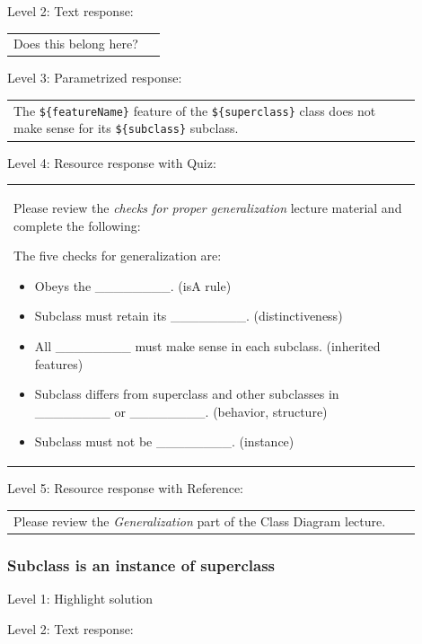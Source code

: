 \noindent Level 2: Text response: \medskip

\begin{tabular}{|p{0.9\linewidth}}
Does this belong here?
\end{tabular} \medskip

\noindent Level 3: Parametrized response: \medskip

\begin{tabular}{|p{0.9\linewidth}}
The \verb|${featureName}| feature of the \verb|${superclass}| class does not make sense for its \verb|${subclass}| subclass.
\end{tabular} \medskip

\noindent Level 4: Resource response with Quiz: \medskip

\begin{tabular}{|p{0.9\linewidth}}
Please review the \textit{checks for proper generalization} lecture material
and complete the following:

The five checks for generalization are:
\begin{itemize}
    \item Obeys the \_\_\_\_\_\_\_\_. (isA rule)
    \item Subclass must retain its \_\_\_\_\_\_\_\_. (distinctiveness)
    \item All \_\_\_\_\_\_\_\_ must make sense in each subclass. (inherited features)
    \item Subclass differs from superclass and other subclasses in \_\_\_\_\_\_\_\_ or \_\_\_\_\_\_\_\_. (behavior, structure)
    \item Subclass must not be \_\_\_\_\_\_\_\_. (instance)
\end{itemize}

\end{tabular} \medskip

\noindent Level 5: Resource response with Reference: \medskip

\begin{tabular}{|p{0.9\linewidth}}
Please review the \textit{Generalization} part of the Class Diagram lecture.
\end{tabular} \medskip


\subsubsection{Subclass is an instance of superclass}

\noindent Level 1: Highlight solution  \medskip

\noindent Level 2: Text response: \medskip

